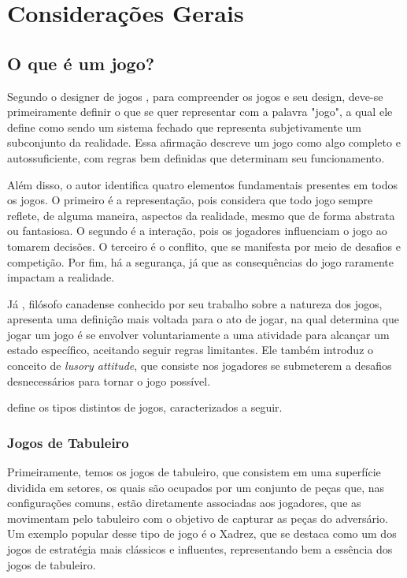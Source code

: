 \chapter{Considerações Gerais}
\label{cap:02}

\section{O que é um jogo?}

Segundo o designer de jogos , para compreender os jogos e seu design, deve-se primeiramente definir o que se quer representar com a palavra "jogo", a qual ele define como sendo um sistema fechado que representa subjetivamente um subconjunto da realidade. Essa afirmação descreve um jogo como algo completo e autossuficiente, com regras bem definidas que determinam seu funcionamento.

Além disso, o autor identifica quatro elementos fundamentais presentes em todos os jogos. O primeiro é a representação, pois considera que todo jogo sempre reflete, de alguma maneira, aspectos da realidade, mesmo que de forma abstrata ou fantasiosa. O segundo é a interação, pois os jogadores influenciam o jogo ao tomarem decisões. O terceiro é o conflito, que se manifesta por meio de desafios e competição. Por fim, há a segurança, já que as consequências do jogo raramente impactam a realidade.


Já , filósofo canadense conhecido por seu trabalho sobre a natureza dos jogos, apresenta uma definição mais voltada para o ato de jogar, na qual determina que jogar um jogo é se envolver voluntariamente a uma atividade para alcançar um estado específico, aceitando seguir regras limitantes. Ele também introduz o conceito de \textit{lusory attitude}, que consiste nos jogadores se submeterem a desafios desnecessários para tornar o jogo possível. 



 define os tipos distintos de jogos, caracterizados a seguir.



\subsection{Jogos de Tabuleiro}

Primeiramente, temos os jogos de tabuleiro, que consistem em uma superfície dividida em setores, os quais são ocupados por um conjunto de peças que, nas configurações comuns, estão diretamente associadas aos jogadores, que as movimentam pelo tabuleiro com o objetivo de capturar as peças do adversário. Um exemplo popular desse tipo de jogo é o Xadrez, que se destaca como um dos jogos de estratégia mais clássicos e influentes, representando bem a essência dos jogos de tabuleiro.

